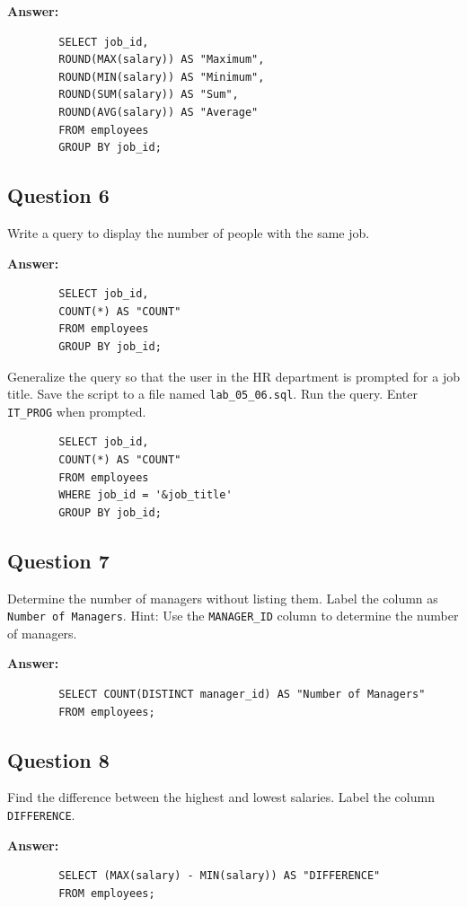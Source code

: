 \documentclass[12pt,a4paper]{article}
\begin{document}
\textbf{Answer:}
    \begin{lstlisting}
        SELECT job_id,
        ROUND(MAX(salary)) AS "Maximum",
        ROUND(MIN(salary)) AS "Minimum",
        ROUND(SUM(salary)) AS "Sum",
        ROUND(AVG(salary)) AS "Average"
        FROM employees
        GROUP BY job_id;
    \end{lstlisting}
    
\subsection*{Question 6}
Write a query to display the number of people with the same job.

\textbf{Answer:}
    \begin{lstlisting}
        SELECT job_id,
        COUNT(*) AS "COUNT"
        FROM employees
        GROUP BY job_id;
    \end{lstlisting}

Generalize the query so that the user in the HR department is prompted for a job title. Save the script 
to a file named \texttt{lab\_05\_06.sql}. Run the query. Enter \texttt{IT\_PROG} when prompted.

    \begin{lstlisting}
        SELECT job_id,
        COUNT(*) AS "COUNT"
        FROM employees
        WHERE job_id = '&job_title'
        GROUP BY job_id;
    \end{lstlisting}
    
\subsection*{Question 7}
Determine the number of managers without listing them. Label the column as \texttt{Number of Managers}. Hint: Use the \texttt{MANAGER\_ID} column to determine the number of managers.

\textbf{Answer:}
    \begin{lstlisting}
        SELECT COUNT(DISTINCT manager_id) AS "Number of Managers"
        FROM employees;
    \end{lstlisting}
    
\subsection*{Question 8}
Find the difference between the highest and lowest salaries. Label the column \texttt{DIFFERENCE}.

\textbf{Answer:}
    \begin{lstlisting}
        SELECT (MAX(salary) - MIN(salary)) AS "DIFFERENCE"
        FROM employees;
    \end{lstlisting}
    
\end{document}
